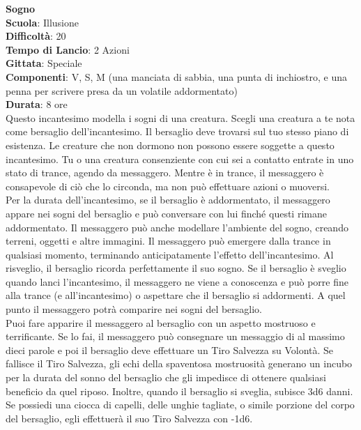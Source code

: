 \begin{multicols}{2}
\medskip\textbf{Sogno}\\
\textbf{Scuola}: Illusione\\
\textbf{Difficoltà}: 20\\
\textbf{Tempo di Lancio}: 2 Azioni\\
\textbf{Gittata}: Speciale\\
\textbf{Componenti}: V, S, M (una manciata di sabbia, una punta di inchiostro, e una penna per scrivere presa da un volatile addormentato)\\
\textbf{Durata}: 8 ore\\
Questo incantesimo modella i sogni di una creatura. Scegli una creatura a te nota come bersaglio dell'incantesimo. Il bersaglio deve trovarsi sul tuo stesso piano di esistenza. Le creature che non dormono non possono essere soggette a questo incantesimo. Tu o una creatura consenziente con cui sei a contatto entrate in uno stato di trance, agendo da messaggero. Mentre è in trance, il messaggero è consapevole di ciò che lo circonda, ma non può effettuare azioni o muoversi.\\
Per la durata dell'incantesimo, se il bersaglio è addormentato, il messaggero appare nei sogni del bersaglio e può conversare con lui finché questi rimane addormentato. Il messaggero può anche modellare l'ambiente del sogno, creando terreni, oggetti e altre immagini. Il messaggero può emergere dalla trance in qualsiasi momento, terminando anticipatamente l'effetto dell'incantesimo. Al risveglio, il bersaglio ricorda perfettamente il suo sogno. Se il bersaglio è sveglio quando lanci l'incantesimo, il messaggero ne viene a conoscenza e può porre fine alla trance (e all'incantesimo) o aspettare che il bersaglio si addormenti. A quel punto il messaggero potrà comparire nei sogni del bersaglio.\\
Puoi fare apparire il messaggero al bersaglio con un aspetto mostruoso e terrificante. Se lo fai, il messaggero può consegnare un messaggio di al massimo dieci parole e poi il bersaglio deve effettuare un Tiro Salvezza su Volontà. Se fallisce il Tiro Salvezza, gli echi della spaventosa mostruosità generano un incubo per la durata del sonno del bersaglio che gli impedisce di ottenere qualsiasi beneficio da quel riposo. Inoltre, quando il bersaglio si sveglia, subisce 3d6 danni.\\
Se possiedi una ciocca di capelli, delle unghie tagliate, o simile porzione del corpo del bersaglio, egli effettuerà il suo Tiro Salvezza con -1d6.


\end{multicols}
